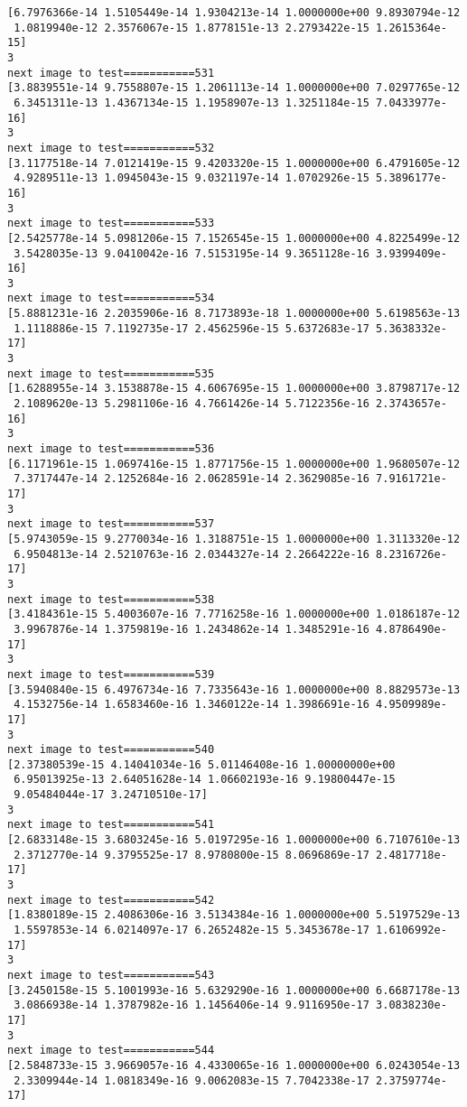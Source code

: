 \documentclass[11pt]{article}
\begin{document}
\begin{Verbatim}[commandchars=\\\{\}]
[6.7976366e-14 1.5105449e-14 1.9304213e-14 1.0000000e+00 9.8930794e-12
 1.0819940e-12 2.3576067e-15 1.8778151e-13 2.2793422e-15 1.2615364e-15]
3
next image to test===========531
[3.8839551e-14 9.7558807e-15 1.2061113e-14 1.0000000e+00 7.0297765e-12
 6.3451311e-13 1.4367134e-15 1.1958907e-13 1.3251184e-15 7.0433977e-16]
3
next image to test===========532
[3.1177518e-14 7.0121419e-15 9.4203320e-15 1.0000000e+00 6.4791605e-12
 4.9289511e-13 1.0945043e-15 9.0321197e-14 1.0702926e-15 5.3896177e-16]
3
next image to test===========533
[2.5425778e-14 5.0981206e-15 7.1526545e-15 1.0000000e+00 4.8225499e-12
 3.5428035e-13 9.0410042e-16 7.5153195e-14 9.3651128e-16 3.9399409e-16]
3
next image to test===========534
[5.8881231e-16 2.2035906e-16 8.7173893e-18 1.0000000e+00 5.6198563e-13
 1.1118886e-15 7.1192735e-17 2.4562596e-15 5.6372683e-17 5.3638332e-17]
3
next image to test===========535
[1.6288955e-14 3.1538878e-15 4.6067695e-15 1.0000000e+00 3.8798717e-12
 2.1089620e-13 5.2981106e-16 4.7661426e-14 5.7122356e-16 2.3743657e-16]
3
next image to test===========536
[6.1171961e-15 1.0697416e-15 1.8771756e-15 1.0000000e+00 1.9680507e-12
 7.3717447e-14 2.1252684e-16 2.0628591e-14 2.3629085e-16 7.9161721e-17]
3
next image to test===========537
[5.9743059e-15 9.2770034e-16 1.3188751e-15 1.0000000e+00 1.3113320e-12
 6.9504813e-14 2.5210763e-16 2.0344327e-14 2.2664222e-16 8.2316726e-17]
3
next image to test===========538
[3.4184361e-15 5.4003607e-16 7.7716258e-16 1.0000000e+00 1.0186187e-12
 3.9967876e-14 1.3759819e-16 1.2434862e-14 1.3485291e-16 4.8786490e-17]
3
next image to test===========539
[3.5940840e-15 6.4976734e-16 7.7335643e-16 1.0000000e+00 8.8829573e-13
 4.1532756e-14 1.6583460e-16 1.3460122e-14 1.3986691e-16 4.9509989e-17]
3
next image to test===========540
[2.37380539e-15 4.14041034e-16 5.01146408e-16 1.00000000e+00
 6.95013925e-13 2.64051628e-14 1.06602193e-16 9.19800447e-15
 9.05484044e-17 3.24710510e-17]
3
next image to test===========541
[2.6833148e-15 3.6803245e-16 5.0197295e-16 1.0000000e+00 6.7107610e-13
 2.3712770e-14 9.3795525e-17 8.9780800e-15 8.0696869e-17 2.4817718e-17]
3
next image to test===========542
[1.8380189e-15 2.4086306e-16 3.5134384e-16 1.0000000e+00 5.5197529e-13
 1.5597853e-14 6.0214097e-17 6.2652482e-15 5.3453678e-17 1.6106992e-17]
3
next image to test===========543
[3.2450158e-15 5.1001993e-16 5.6329290e-16 1.0000000e+00 6.6687178e-13
 3.0866938e-14 1.3787982e-16 1.1456406e-14 9.9116950e-17 3.0838230e-17]
3
next image to test===========544
[2.5848733e-15 3.9669057e-16 4.4330065e-16 1.0000000e+00 6.0243054e-13
 2.3309944e-14 1.0818349e-16 9.0062083e-15 7.7042338e-17 2.3759774e-17]

\end{Verbatim}
\end{document}
